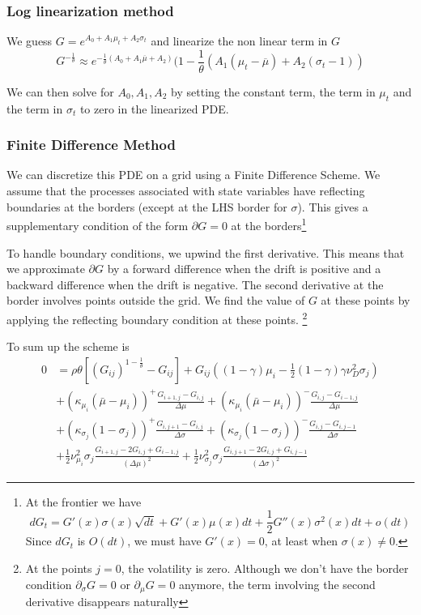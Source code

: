 \documentclass[english]{article}
\begin{document}
\subsubsection{Log linearization method}
We guess $G = e^{A_0+ A_1\mu_t + A_2 \sigma_t}$ and linearize the non linear term in $G$ 
$$G^{-\frac{1}{\theta}} \approx e^{-\frac{1}{\theta}(A_0 + A_1 \overline{\mu} + A_2)}(1-\frac{1}{\theta}(A_1(\mu_t -\overline{\mu}) + A_2 (\sigma_t-1))$$
	
We can then solve for $A_0, A_1, A_2$ by setting the constant term, the term in $\mu_t$ and the term in $\sigma_t$ to zero in the linearized PDE.
\subsubsection{Finite Difference Method}
We can discretize this PDE on a grid using a Finite Difference Scheme. 
We assume that the processes associated with state variables have reflecting boundaries at the borders (except at the LHS border for $\sigma$). This gives a supplementary condition of the form $\partial G = 0$ at the borders\footnote{At the frontier we have
$$dG_{t} = G'(x) \sigma(x) \sqrt{dt} + G'(x)\mu(x) dt + \frac{1}{2}G''(x)\sigma^2(x)dt + o(dt)$$
Since $dG_t$ is $O(dt)$, we must have $G'(x) = 0$, at least when $\sigma(x) \neq 0$.}


To handle boundary conditions, we upwind the first derivative. This means that we approximate $\partial G$ by a forward difference when the drift is positive and a backward difference when the drift is negative. The second derivative at the border involves points outside the grid. We find the value of $G$ at these points by applying the reflecting boundary condition at these points. \footnote{At the points $j = 0$, the volatility is zero. Although we don't have the border condition $\partial_\sigma G = 0$ or $\partial_\mu G = 0$ anymore, the term involving the second derivative disappears naturally}


To sum up the scheme is 
\begin{align*}
	0&= \rho \theta[(G_{ij})^{1-\frac{1}{\theta}}- G_{ij}]+G_{ij}((1-\gamma)\mu_i-\frac{1}{2}(1-\gamma)\gamma\nu_D^2\sigma_j)\\
	&+(\kappa_{\mu_i}(\bar{\mu}-\mu_i))^+\frac{G_{i+1, j}-G_{i, j}}{\Delta \mu}+(\kappa_{\mu_i}(\bar{\mu}-\mu_i))^-\frac{G_{i, j}-G_{i-1, j}}{\Delta \mu}\\
	&+(\kappa_{\sigma_j}(1-\sigma_j))^+\frac{G_{i, j+1}-G_{i,j}}{\Delta \sigma}+(\kappa_{\sigma_j}(1-\sigma_j))^-\frac{G_{i, j}-G_{i,j-1}}{\Delta \sigma}\\
	&+\frac{1}{2}\nu_{\mu_i}^{2}\sigma_j\frac{G_{i+1, j} - 2 G_{i, j} + G_{i-1, j}}{(\Delta\mu)^2}+\frac{1}{2}\nu_{\sigma_j}^{2}\sigma_j\frac{G_{i, j+1} - 2 G_{i, j} + G_{i, j-1}}{(\Delta\sigma)^2}
\end{align*}
\end{document}
